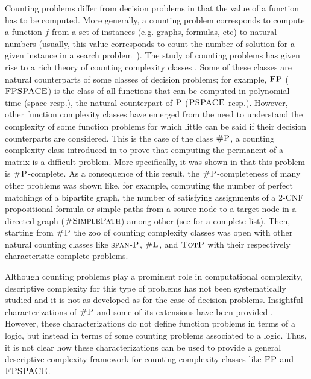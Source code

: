 Counting problems differ from decision problems in that the value of a function has to be computed.
More generally, a counting problem corresponds to compute a function $f$ from a set of instances (e.g. graphs, formulas, etc) to natural numbers (usually, this value corresponds to count the number of solution for a given instance in a search problem~\cite{valiant-paper}). 
The study of counting problems has given rise to a rich theory of counting complexity classes \cite{HV95,F97,HO02,AB09}. Some of these classes are natural counterparts of some classes of decision problems; for example, $\text{\sc FP}$ ($\text{\sc FPSPACE}$) is the class of all functions that can be computed in polynomial time (space resp.), the natural counterpart of $\text{\sc P}$ ($\text{\sc PSPACE}$ resp.). 
However, other function complexity classes have emerged from the need to understand the complexity of some function problems for which little can be said if their decision counterparts are considered. This is the case of the class $\text{\sc \#P}$, a counting complexity class introduced in \cite{Valiant79} to prove that computing the permanent of a matrix is a difficult problem. More specifically, it was shown in  \cite{Valiant79}  that this problem is $\text{\sc \#P}$-complete. As a consequence of this result, the $\text{\sc \#P}$-completeness of many other problems was shown like, for example, computing the number of perfect matchings of a bipartite graph, the number of satisfying assignments of a 2-CNF propositional formula or simple paths from a source node to a target node in a directed graph ($\textsc{\#SimplePath}$) \cite{V79b} among other (see \cite{BW05} for a complete list). 
Then, starting from $\text{\sc \#P}$ the zoo of counting complexity classes was open with other natural counting classes like $\text{\sc span-P}$, $\text{\sc \#L}$, and $\text{\sc TotP}$ with their respectively characteristic complete problems.

Although counting problems play a prominent role in computational complexity, descriptive complexity for this type of problems has not been systematically studied and it is not as developed as for the case of decision problems. Insightful characterizations of $\text{\sc \#P}$ and some of its extensions have been provided \cite{SST95,B95,CG96}. However, these characterizations do not define function problems in terms of a logic, but instead in terms of some counting problems associated to a logic. Thus, it is not clear how these characterizations can be used to provide a general descriptive complexity framework for counting complexity classes like $\text{\sc FP}$ and $\text{\sc FPSPACE}$.

